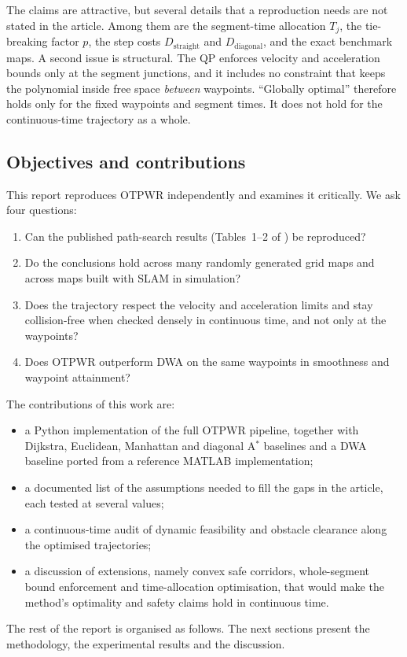 \documentclass[11pt,a4paper]{article}
\begin{document}
The claims are attractive, but several details that a reproduction needs
are not stated in the article. Among them are the segment-time allocation
$T_j$, the tie-breaking factor $p$, the step costs $D_{\mathrm{straight}}$ and
$D_{\mathrm{diagonal}}$, and the exact benchmark maps. A second issue is
structural. The QP enforces velocity and acceleration bounds only at the
segment junctions, and it includes no constraint that keeps the polynomial
inside free space \emph{between} waypoints. ``Globally optimal'' therefore
holds only for the fixed waypoints and segment times. It does not hold for
the continuous-time trajectory as a whole.

\subsection{Objectives and contributions}
\label{sec:objectives}

This report reproduces OTPWR independently and examines it critically. We
ask four questions:
\begin{enumerate}[label=\textbf{Q\arabic*.},nosep]
  \item Can the published path-search results (Tables~1--2 of
        \citep{luo2024otpwr}) be reproduced?
  \item Do the conclusions hold across many randomly generated grid maps and
        across maps built with SLAM in simulation?
  \item Does the trajectory respect the velocity and acceleration limits and
        stay collision-free when checked densely in continuous time, and not
        only at the waypoints?
  \item Does OTPWR outperform DWA on the same waypoints in smoothness and
        waypoint attainment?
\end{enumerate}

The contributions of this work are:
\begin{itemize}[nosep]
  \item a Python implementation of the full OTPWR pipeline, together
        with Dijkstra, Euclidean, Manhattan and diagonal A$^\ast$ baselines
        and a DWA baseline ported from a reference MATLAB implementation;
  \item a documented list of the assumptions needed to fill the gaps in the
        article, each tested at several values;
  \item a continuous-time audit of dynamic feasibility and obstacle clearance
        along the optimised trajectories;
  \item a discussion of extensions, namely convex safe corridors,
        whole-segment bound enforcement and time-allocation optimisation,
        that would make the method's optimality and safety claims hold in
        continuous time.
\end{itemize}

The rest of the report is organised as follows. The next sections present
the methodology, the experimental results and the discussion.



\end{document}
